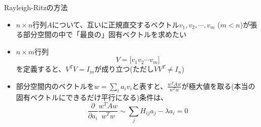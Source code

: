 \begin{frame}[t,fragile]{Rayleigh-Ritzの方法}
  \begin{itemize}
  \item $n \times n$行列$A$について、互いに正規直交するベクトル$v_1,v_2,\cdots,v_m$ ($m < n$)が張る部分空間の中で「最良の」固有ベクトルを求めたい
  \item $n \times m$行列
    \[
    V=\big[v_1 v_2 \cdots v_m\big]
    \]
    を定義すると、$V^TV=I_m$が成り立つ(ただし$VV^T \ne I_n$)
  \item 部分空間内のベクトルを$w = \sum_i a_i v_i$と表すと、$\displaystyle \frac{w^TAw}{w^Tw}$が極大値を取る(本当の固有ベクトルにできるだけ平行になる)条件は、
    \[
    \frac{\partial}{\partial a_i} \frac{w^TAw}{w^Tw} \sim \sum_j H_{ij}a_j - \lambda a_i = 0
    \]
  \end{itemize}
\end{frame}
